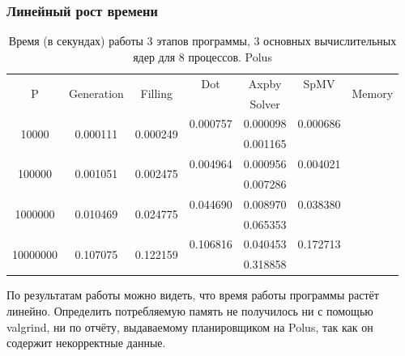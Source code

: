 	\subsubsection{Линейный рост времени}
		\begin{table}[H]
			\begin{tabular}{|c||c|c|c|c|c|c|}
				\hline
				\multirow{2}{*}{P} &  \multirow{2}{*}{Generation} & \multirow{2}{*}{Filling} & Dot & Axpby & SpMV          & \multirow{2}{*}{Memory} \\ \cline{4-6}
				                   &                              &                         & \multicolumn{3}{c|}{Solver}  &                         \\ \hline
                \multirow{2}{*}{10000} & \multirow{2}{*}{0.000111} & \multirow{2}{*}{0.000249} & 0.000757 & 0.000098 & 0.000686       & \multirow{2}{*}{} \\ \cline{4-6}
                                       &                     &                    & \multicolumn{3}{c|}{0.001165} &          \\ \hline
                \multirow{2}{*}{100000} &  \multirow{2}{*}{0.001051} & \multirow{2}{*}{0.002475} & 0.004964 & 0.000956 & 0.004021 & \multirow{2}{*}{} \\ \cline{4-6}
                                      &                     &                     & \multicolumn{3}{c|}{0.007286} &  \\ \hline
                \multirow{2}{*}{1000000} &  \multirow{2}{*}{0.010469} & \multirow{2}{*}{0.024775} & 0.044690 & 0.008970 & 0.038380 & \multirow{2}{*}{} \\ \cline{4-6}
                                       &                     &                    & \multicolumn{3}{c|}{0.065353} &  \\ \hline
                \multirow{2}{*}{10000000} &  \multirow{2}{*}{0.107075} & \multirow{2}{*}{0.122159} & 0.106816 & 0.040453 & 0.172713 & \multirow{2}{*}{} \\ \cline{4-6}
                                       &                     &                    & \multicolumn{3}{c|}{0.318858} &  \\ \hline
			\end{tabular}
			\caption{Время (в секундах) работы 3 этапов программы, 3 основных вычислительных ядер для 8 процессов. Polus}
			\label{lineal}
		\end{table}
		По результатам работы можно видеть, что время работы программы растёт линейно. Определить потребляемую память не получилось ни с помощью valgrind, ни по отчёту, выдаваемому планировщиком на Polus, так как он содержит некорректные данные.
